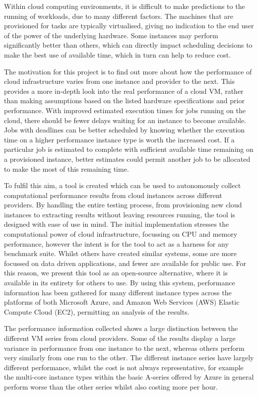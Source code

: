 \documentclass{llncs}
\begin{document}
Within cloud computing environments, it is difficult to make predictions to the running of workloads, due to many different factors. The machines that are provisioned for tasks are typically virtualised, giving no indication to the end user of the power of the underlying hardware. Some instances may perform significantly better than others, which can directly impact scheduling decisions to make the best use of available time, which in turn can help to reduce cost.

The motivation for this project is to find out more about how the performance of cloud infrastructure varies from one instance and provider to the next. This provides a more in-depth look into the real performance of a cloud VM, rather than making assumptions based on the listed hardware specifications and prior performance. With improved estimated execution times for jobs running on the cloud, there should be fewer delays waiting for an instance to become available. Jobs with deadlines can be better scheduled by knowing whether the execution time on a higher performance instance type is worth the increased cost. If a particular job is estimated to complete with sufficient available time remaining on a provisioned instance, better estimates could permit another job to be allocated to make the most of this remaining time.

To fulfil this aim, a tool is created which can be used to autonomously collect computational performance results from cloud instances across different providers. By handling the entire testing process, from provisioning new cloud instances to extracting results without leaving resources running, the tool is designed with ease of use in mind. The initial implementation stresses the computational power of cloud infrastructure, focussing on CPU and memory performance, however the intent is for the tool to act as a harness for any benchmark suite. Whilst others have created similar systems, some are more focussed on data driven applications, and fewer are available for public use. For this reason, we present this tool as an open-source alternative, where it is available in its entirety for others to use. By using this system, performance information has been gathered for many different instance types across the platforms of both Microsoft Azure, and Amazon Web Services (AWS) Elastic Compute Cloud (EC2), permitting an analysis of the results.

The performance information collected shows a large distinction between the different VM series from cloud providers. Some of the results display a large variance in performance from one instance to the next, whereas others perform very similarly from one run to the other. The different instance series have largely different performance, whilst the cost is not always representative, for example the multi-core instance types within the basic A-series offered by Azure in general perform worse than the other series whilst also costing more per hour.
\end{document}
